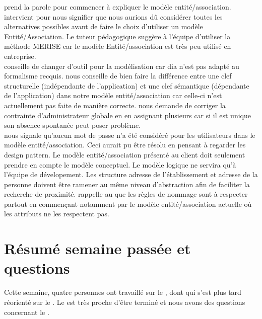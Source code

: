 \documentclass [a4paper] {article}
\begin{document}
\Julie{} prend la parole pour commencer à expliquer le modèle entité/association.
\nomTuteurPedago{} intervient pour nous signifier que nous aurions dû considérer toutes les alternatives possibles avant de  faire le choix d'utiliser un modèle Entité/Association. Le tuteur pédagogique suggère à l'équipe d'utiliser la méthode MERISE car le modèle Entité/association est très peu utilisé en entreprise. \\
\nomTuteurPedago{} conseille de changer d'outil pour la modélisation car dia n'est pas adapté au formalisme recquis. \nomTuteurPedago{} nous conseille de bien faire la différence entre une clef structurelle (indépendante de l'application) et une clef sémantique (dépendante de l'application) dans notre modèle entité/association car celle-ci n'est actuellement pas faite de manière correcte.
\nomTuteurPedago{} nous demande de corriger la contrainte d'administrateur globale en en assignant plusieurs car si il est unique son absence spontanée peut poser problème. \\
\nomTuteurPedago{} nous signale qu'aucun mot de passe n'a été considéré pour les utilisateurs dans le modèle entité/association. Ceci aurait pu être résolu en pensant à regarder les design pattern. 
Le modèle entité/association présenté au client doit seulement prendre en compte le modèle conceptuel. Le modèle logique ne servira qu'à l'équipe de dévelopement. 
Les structure adresse de l'établissement et adresse de la personne doivent être ramener au même niveau d'abstraction afin de faciliter la recherche de proximité.
\nomTuteurPedago{} rappelle au \RGC que les règles de nommage sont à respecter partout en commençant notamment par le modèle entité/association actuelle où les attributs ne les respectent pas.



\section{Résumé semaine passée et questions}
Cette semaine, quatre personnes ont travaillé sur le \DSE{}, dont \Michel{} qui s'est plus tard réorienté sur le \PTV{}. Le \DSECourt{} est très proche d'être terminé et nous avons des questions concernant le \PTVCourt{}.
\end{document}
